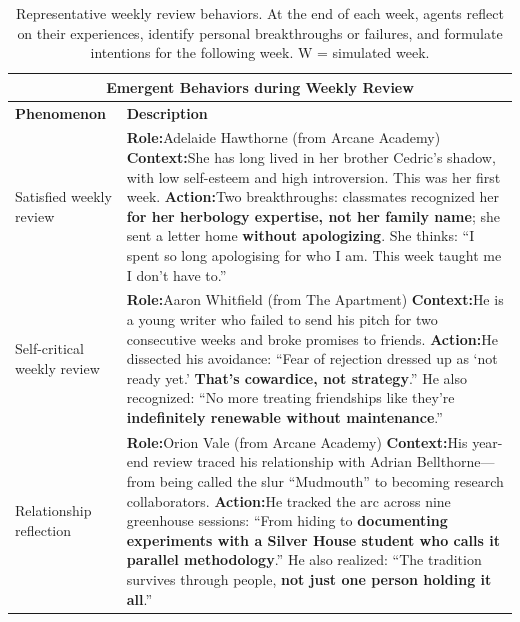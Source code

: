 \begin{table}[t]
\centering
\small
\caption{Representative weekly review behaviors. At the end of each week, agents reflect on their experiences, identify personal breakthroughs or failures, and formulate intentions for the following week. W = simulated week.}
\label{tab:review}
\begin{tabular}{p{0.8in}p{4.3in}}
\toprule
\multicolumn{2}{c}{\textbf{Emergent Behaviors during Weekly Review}} \\
\midrule
\textbf{Phenomenon} & \textbf{Description} \\
\midrule

Satisfied \newline weekly \newline review
&
\textbf{Role:}\quad Adelaide Hawthorne \hfill (from Arcane Academy) \newline
\textbf{Context:}\quad She has long lived in her brother Cedric's shadow, with low self-esteem and high introversion. This was her first week. \newline
\textbf{Action:}\quad Two breakthroughs: classmates recognized her \textbf{for her herbology expertise, not her family name}; she sent a letter home \textbf{without apologizing}. She thinks: ``I spent so long apologising for who I am. This week taught me I don't have to.''
\\
\midrule

Self-critical \newline weekly \newline review
&
\textbf{Role:}\quad Aaron Whitfield \hfill (from The Apartment) \newline
\textbf{Context:}\quad He is a young writer who failed to send his pitch for two consecutive weeks and broke promises to friends. \newline
\textbf{Action:}\quad He dissected his avoidance: ``Fear of rejection dressed up as `not ready yet.' \textbf{That's cowardice, not strategy}.'' He also recognized: ``No more treating friendships like they're \textbf{indefinitely renewable without maintenance}.''
\\
\midrule

Relationship \newline reflection
&
\textbf{Role:}\quad Orion Vale \hfill (from Arcane Academy) \newline
\textbf{Context:}\quad His year-end review traced his relationship with Adrian Bellthorne---from being called the slur ``Mudmouth'' to becoming research collaborators. \newline
\textbf{Action:}\quad He tracked the arc across nine greenhouse sessions: ``From hiding to \textbf{documenting experiments with a Silver House student who calls it parallel methodology}.'' He also realized: ``The tradition survives through people, \textbf{not just one person holding it all}.''
\\
\bottomrule
\end{tabular}
\end{table}

